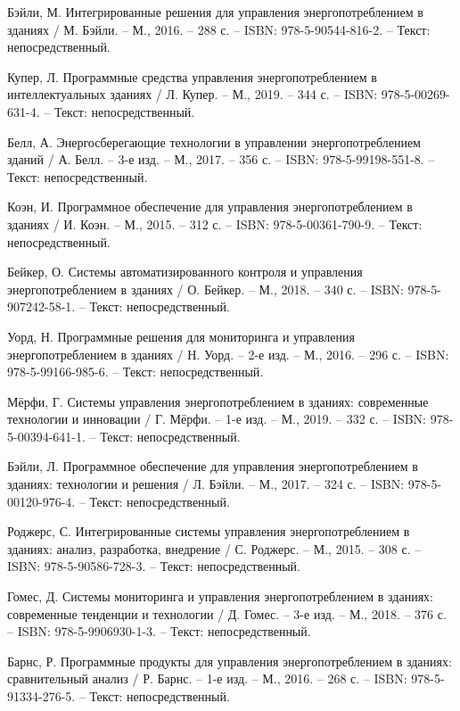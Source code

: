 \begin{thebibliography}{50}
	 Бэйли, М. Интегрированные решения для управления энергопотреблением в зданиях / М. Бэйли. – М., 2016. – 288 с. – ISBN: 978-5-90544-816-2. – Текст: непосредственный.
	
	 Купер, Л. Программные средства управления энергопотреблением в интеллектуальных зданиях / Л. Купер. – М., 2019. – 344 с. – ISBN: 978-5-00269-631-4. – Текст: непосредственный.
	
	 Белл, А. Энергосберегающие технологии в управлении энергопотреблением зданий / А. Белл. – 3-е изд. – М., 2017. – 356 с. – ISBN: 978-5-99198-551-8. – Текст: непосредственный.

	 Коэн, И. Программное обеспечение для управления энергопотреблением в зданиях / И. Коэн. – М., 2015. – 312 с. – ISBN: 978-5-00361-790-9. – Текст: непосредственный.

	 Бейкер, О. Системы автоматизированного контроля и управления энергопотреблением в зданиях / О. Бейкер. – М., 2018. – 340 с. – ISBN: 978-5-907242-58-1. – Текст: непосредственный.
	
	 Уорд, Н. Программные решения для мониторинга и управления энергопотреблением в зданиях / Н. Уорд. – 2-е изд. – М., 2016. – 296 с. – ISBN: 978-5-99166-985-6. – Текст: непосредственный.
	
	 Мёрфи, Г. Системы управления энергопотреблением в зданиях: современные технологии и инновации / Г. Мёрфи. – 1-е изд. – М., 2019. – 332 с. – ISBN: 978-5-00394-641-1. – Текст: непосредственный.
	
	 Бэйли, Л. Программное обеспечение для управления энергопотреблением в зданиях: технологии и решения / Л. Бэйли. – М., 2017. – 324 с. – ISBN: 978-5-00120-976-4. – Текст: непосредственный.
	
	 Роджерс, С. Интегрированные системы управления энергопотреблением в зданиях: анализ, разработка, внедрение / С. Роджерс. – М., 2015. – 308 с. – ISBN: 978-5-90586-728-3. – Текст: непосредственный.
	
	 Гомес, Д. Системы мониторинга и управления энергопотреблением в зданиях: современные тенденции и технологии / Д. Гомес. – 3-е изд. – М., 2018. – 376 с. – ISBN: 978-5-9906930-1-3. – Текст: непосредственный.
	
	 Барнс, Р. Программные продукты для управления энергопотреблением в зданиях: сравнительный анализ / Р. Барнс. – 1-е изд. – М., 2016. – 268 с. – ISBN: 978-5-91334-276-5. – Текст: непосредственный.
	

\end{thebibliography}
